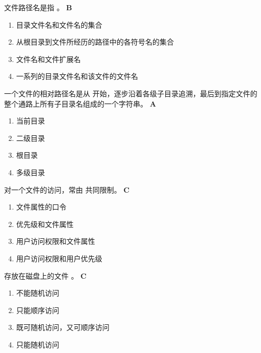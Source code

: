 \begin{problem}
	文件路径名是指 \myline。
	\textbf{B}
		\begin{enumerate}[label=\Alph*.]
			\item 目录文件名和文件名的集合
			\item 从根目录到文件所经历的路径中的各符号名的集合
			\item 文件名和文件扩展名
			\item 一系列的目录文件名和该文件的文件名
		\end{enumerate}
\end{problem}


\begin{problem}
	一个文件的相对路径名是从 \myline 开始，逐步沿着各级子目录追溯，最后到指定文件的整个通路上所有子目录名组成的一个字符串。
	\textbf{A}
	\vspace{-0.5em}
	\begin{multicols}{4}
		\begin{enumerate}[label=\Alph*.]
			\item 当前目录
			\item 二级目录
			\item 根目录
			\item 多级目录
		\end{enumerate}
	\end{multicols}
	\vspace{-1em}
\end{problem}


\begin{problem}
	对一个文件的访问，常由 \myline 共同限制。
	\textbf{C}
	\vspace{-0.5em}
	\begin{multicols}{2}
		\begin{enumerate}[label=\Alph*.]
			\item 文件属性的口令
			\item 优先级和文件属性
			\item 用户访问权限和文件属性
			\item 用户访问权限和用户优先级
		\end{enumerate}
	\end{multicols}
	\vspace{-1em}
\end{problem}


\begin{problem}
	存放在磁盘上的文件 \myline。
	\textbf{C}
	\vspace{-0.5em}
	\begin{multicols}{2}
		\begin{enumerate}[label=\Alph*.]
			\item 不能随机访问
			\item 只能顺序访问
			\item 既可随机访问，又可顺序访问
			\item 只能随机访问
		\end{enumerate}
	\end{multicols}
	\vspace{-1em}
\end{problem}


